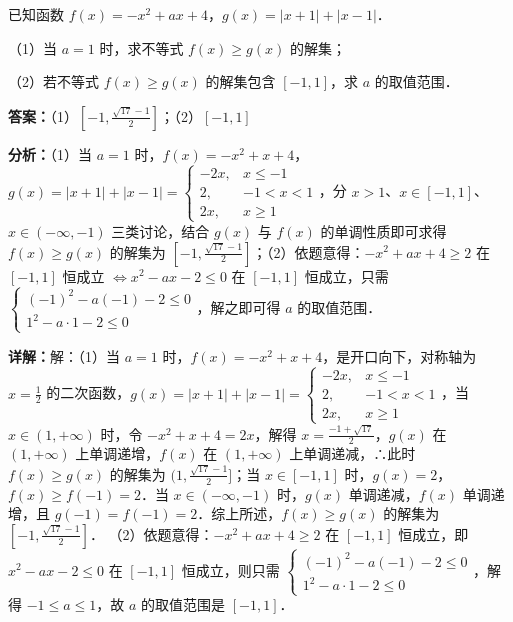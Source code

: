 \begin{question}[points=10]
[选修 4-5：不等式选讲]

已知函数 $f(x)=-x^2+ax+4$，$g(x)=|x+1|+|x-1|$．

（1）当 $a=1$ 时，求不等式 $f(x)\geq g(x)$ 的解集；

（2）若不等式 $f(x)\geq g(x)$ 的解集包含 $[-1,1]$，求 $a$ 的取值范围．
\begin{solution}
\textbf{答案：}（1）$[-1,\frac{\sqrt{17}-1}{2}]$；（2）$[-1,1]$

\textbf{分析：}（1）当 $a=1$ 时，$f(x)=-x^2+x+4$，$g(x)=|x+1|+|x-1|=\begin{cases} -2x, & x\leq-1 \\ 2, & -1<x<1 \\ 2x, & x\geq1 \end{cases}$，分 $x>1$、$x\in[-1,1]$、$x\in(-\infty,-1)$ 三类讨论，结合 $g(x)$ 与 $f(x)$ 的单调性质即可求得 $f(x)\geq g(x)$ 的解集为 $[-1,\frac{\sqrt{17}-1}{2}]$；（2）依题意得：$-x^2+ax+4\geq2$ 在 $[-1,1]$ 恒成立 $\Leftrightarrow x^2-ax-2\leq0$ 在 $[-1,1]$ 恒成立，只需 $\begin{cases} (-1)^2-a(-1)-2\leq0 \\ 1^2-a\cdot1-2\leq0 \end{cases}$，解之即可得 $a$ 的取值范围．

\textbf{详解：}解：（1）当 $a=1$ 时，$f(x)=-x^2+x+4$，是开口向下，对称轴为 $x=\frac{1}{2}$ 的二次函数，$g(x)=|x+1|+|x-1|=\begin{cases} -2x, & x\leq-1 \\ 2, & -1<x<1 \\ 2x, & x\geq1 \end{cases}$，当 $x\in(1,+\infty)$ 时，令 $-x^2+x+4=2x$，解得 $x=\frac{-1+\sqrt{17}}{2}$，$g(x)$ 在 $(1,+\infty)$ 上单调递增，$f(x)$ 在 $(1,+\infty)$ 上单调递减，∴此时 $f(x)\geq g(x)$ 的解集为 $(1,\frac{\sqrt{17}-1}{2}]$；当 $x\in[-1,1]$ 时，$g(x)=2$，$f(x)\geq f(-1)=2$．当 $x\in(-\infty,-1)$ 时，$g(x)$ 单调递减，$f(x)$ 单调递增，且 $g(-1)=f(-1)=2$．综上所述，$f(x)\geq g(x)$ 的解集为 $[-1,\frac{\sqrt{17}-1}{2}]$．
（2）依题意得：$-x^2+ax+4\geq2$ 在 $[-1,1]$ 恒成立，即 $x^2-ax-2\leq0$ 在 $[-1,1]$ 恒成立，则只需 $\begin{cases} (-1)^2-a(-1)-2\leq0 \\ 1^2-a\cdot1-2\leq0 \end{cases}$，解得 $-1\leq a\leq1$，故 $a$ 的取值范围是 $[-1,1]$．
\end{solution}
\end{question}

